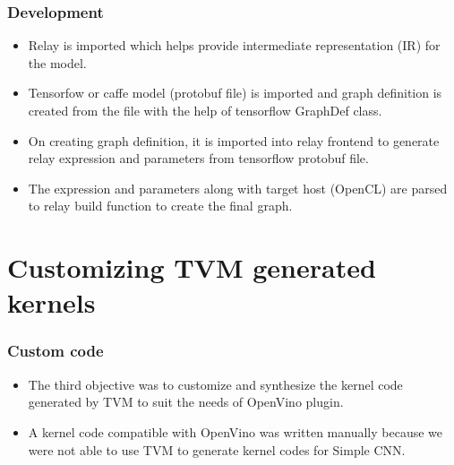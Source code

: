 \documentclass[titlepage]{report}
\begin{document}
\subsection{Development}
\begin{itemize}
    \item Relay is imported which helps provide intermediate representation (IR) for the model.
    \item Tensorfow or caffe model (protobuf file) is imported and graph definition is created from the file with the help of tensorflow GraphDef class.
    \item On creating graph definition, it is imported into relay frontend to generate relay expression and parameters from tensorflow protobuf file. 
    \item The expression and parameters along with target host (OpenCL) are parsed to relay build function to create the final graph. 
\end{itemize}




\chapter{ Customizing TVM generated kernels}  

\subsection{Custom code}
\begin{itemize}
    \item The third objective was to customize and synthesize the kernel code generated by TVM to suit the needs of OpenVino plugin.
    \item  A kernel code compatible with OpenVino was written manually because we were not able to use TVM to generate kernel codes for Simple CNN.
    
\end{itemize}
\end{document}

